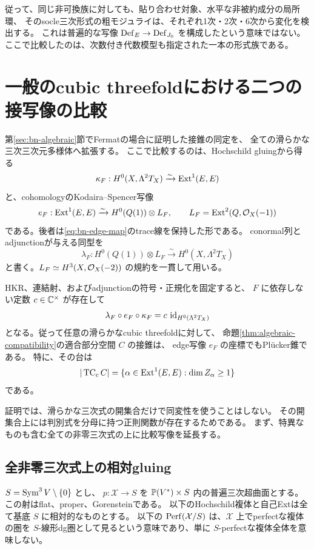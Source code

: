 従って、同じ非可換族に対しても、貼り合わせ対象、水平な非被約成分の局所環、
そのsocle三次形式の粗モジュライは、それぞれ1次・2次・6次から変化を検出する。
これは普遍的な写像 $\operatorname{Def}_E\to\operatorname{Def}_{J_0}$ を構成したという意味ではない。
ここで比較したのは、次数付き代数模型も指定された一本の形式族である。

\section{一般のcubic threefoldにおける二つの接写像の比較}
\label{sec:general-tangent-comparison}

第\ref{sec:bn-algebraic}節でFermatの場合に証明した接錐の同定を、
全ての滑らかな三次三次元多様体へ拡張する。
ここで比較するのは、Hochschild gluingから得る
\[
 \kappa_F:H^0(X,\Lambda^2T_X)\xrightarrow{\sim}\operatorname{Ext}^1(E,E)
\]
と、cohomologyのKodaira--Spencer写像
\[
 e_F:\operatorname{Ext}^1(E,E)\xrightarrow{\sim}H^0(Q(1))\otimes L_F,
 \qquad L_F=\operatorname{Ext}^2(Q,\mathcal O_X(-1))
\]
である。後者は\eqref{eq:bn-edge-map}のtrace線を保持した形である。
conormal列とadjunctionが与える同型を
\[
 \lambda_F:H^0(Q(1))\otimes L_F
       \xrightarrow{\sim}H^0(X,\Lambda^2T_X)
\]
と書く。$L_F\simeq H^3(X,\mathcal O_X(-2))$ の規約を一貫して用いる。

\begin{theorem}
\label{thm:general-tangent-comparison}
HKR、連結射、およびadjunctionの符号・正規化を固定すると、
$F$ に依存しない定数 $c\in\mathbb C^\times$ が存在して
\[
               \lambda_F\circ e_F\circ\kappa_F
                    =c\,\operatorname{id}_{H^0(\Lambda^2T_X)}
\]
となる。従って任意の滑らかなcubic threefoldに対して、
命題\ref{thm:algebraic-compatibility}の適合部分空間 $C$ の接錐は、
edge写像 $e_F$ の座標でもPl\"ucker錐である。
特に、その台は
\[
 |\operatorname{TC}_cC|
 =\{\alpha\in\operatorname{Ext}^1(E,E):\dim Z_\alpha\ge1\}
\]
である。
\end{theorem}

証明では、滑らかな三次式の開集合だけで同変性を使うことはしない。
その開集合上には判別式を分母に持つ正則関数が存在するためである。
まず、特異なものも含む全ての非零三次式の上に比較写像を延長する。

\subsection{全非零三次式上の相対gluing}

$S=\operatorname{Sym}^3V\setminus\{0\}$ とし、
$p:\mathcal X\to S$ を $\mathbb P(V^*)\times S$ 内の普遍三次超曲面とする。
この射はflat、proper、Gorensteinである。
以下のHochschild複体と自己Extは全て基底 $S$ に相対的なものとする。
以下の $\operatorname{Perf}(\mathcal X/S)$ は、$\mathcal X$ 上でperfectな複体の圏を
$S$-線形dg圏として見るという意味であり、単に $S$-perfectな複体全体を意味しない。


